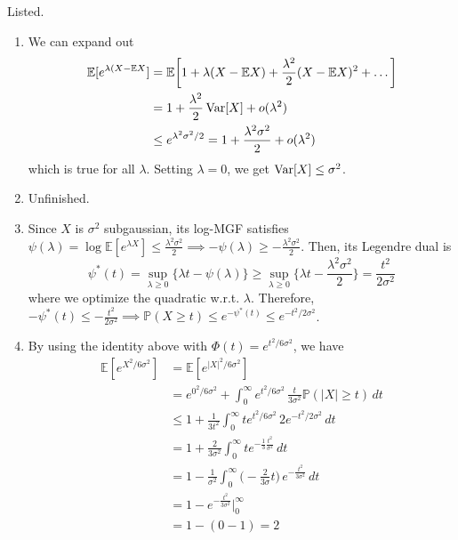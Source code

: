   \begin{solution}
  Listed. 
  \begin{enumerate}
      \item We can expand out 
      \begin{align*}
          \mathbb{E}[e^{\lambda (X - \mathbb{E} X}] & = \mathbb{E} \bigg[ 1 + \lambda( X - \mathbb{E}X) + \frac{\lambda^2}{2} (X - \mathbb{E} X)^2 + \ldots \bigg] \\
          & = 1 + \frac{\lambda^2}{2} \Var[X] + o(\lambda^2) \\
          & \leq e^{\lambda^2 \sigma^2 / 2} = 1 + \frac{\lambda^2 \sigma^2}{2} + o (\lambda^2)
      \end{align*}
      which is true for all $\lambda$. Setting $\lambda = 0$, we get $\Var[X] \leq \sigma^2$. 
      
      \item Unfinished. 
      
      \item Since $X$ is $\sigma^2$ subgaussian, its log-MGF satisfies $\psi(\lambda) = \log \mathbb{E}[e^{\lambda X}] \leq \frac{\lambda^2 \sigma^2}{2} \implies - \psi(\lambda) \geq - \frac{\lambda^2 \sigma^2}{2}$. Then, its Legendre dual is 
      \[\psi^\ast (t) = \sup_{\lambda \geq 0} \{ \lambda t - \psi(\lambda)\} \geq \sup_{\lambda \geq 0} \{ \lambda t - \frac{\lambda^2 \sigma^2}{2} \} = \frac{t^2}{2 \sigma^2}\]
      where we optimize the quadratic w.r.t. $\lambda$. Therefore, $-\psi^* (t) \leq - \frac{t^2}{2\sigma^2} \implies \mathbb{P}(X \geq t) \leq e^{ - \psi^* (t)} \leq e^{- t^2/ 2 \sigma^2}$. 
      
      
      \item By using the identity above with $\Phi(t) = e^{t^2 / 6 \sigma^2}$, we have 
      \begin{align*}
          \mathbb{E}[e^{X^2 / 6 \sigma^2}] & = \mathbb{E}[e^{|X|^2 / 6 \sigma^2}] \\
          & = e^{0^2 / 6 \sigma^2} + \int_0^\infty e^{t^2 / 6 \sigma^2} \, \frac{t}{3 \sigma^2} \mathbb{P}(|X| \geq t) \, dt \\
          & \leq 1 + \frac{1}{3t^2} \int_0^\infty t e^{t^2 / 6 \sigma^2} \, 2 e^{-t^2 / 2\sigma^2} \, dt\\
          & = 1 + \frac{2}{3 \sigma^2} \int_0^\infty t e^{-\frac{1}{3} \frac{t^2}{\sigma^2}} \, dt \\
          & = 1 - \frac{1}{\sigma^2} \int_0^\infty \Big( - \frac{2}{3 \sigma} t \Big) \, e^{- \frac{t^2}{3 \sigma^2}} \, dt \\
          & = 1 - e^{- \frac{t^2}{3 \sigma^2}} \bigg|_0^\infty \\
          & = 1 - (0 - 1) = 2 
      \end{align*}
      

\end{enumerate}
\end{solution}
